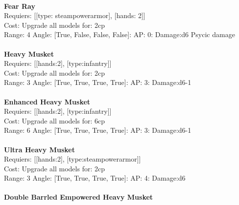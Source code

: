 \ \\
{\bf Fear Ray } \\

Requiers: [[type: steampowerarmor], [hands: 2]] \\
Cost: Upgrade all models for: 2cp \\


Range: 4  Angle: [True, False, False, False]: AP: 0: Damage:d6 Psycic damage \\








\ \\
{\bf Heavy Musket } \\

Requiers: [[hands:2], [type:infantry]] \\
Cost: Upgrade all models for: 2cp \\


Range: 3  Angle: [True, True, True, True]: AP: 3: Damage:d6-1 \\








\ \\
{\bf Enhanced Heavy Musket } \\

Requiers: [[hands:2], [type:infantry]] \\
Cost: Upgrade all models for: 6cp \\


Range: 6  Angle: [True, True, True, True]: AP: 3: Damage:d6-1 \\








\ \\
{\bf Ultra Heavy Musket } \\

Requiers: [[hands:2], [type:steampowerarmor]] \\
Cost: Upgrade all models for: 2cp \\


Range: 3  Angle: [True, True, True, True]: AP: 4: Damage:d6 \\








\ \\
{\bf Double Barrled Empowered Heavy Musket } \\


